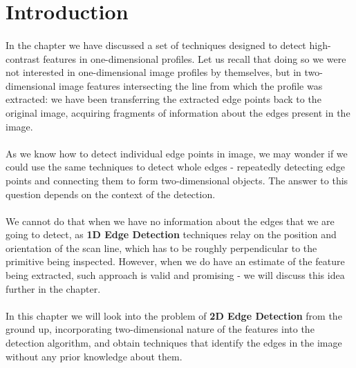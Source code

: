 \section{Introduction}

\paragraph*{}
In the  chapter we have discussed a set of techniques designed to detect high-contrast features in one-dimensional profiles. Let us recall that doing so we were not interested in one-dimensional image profiles by themselves, but in two-dimensional image features intersecting the line from which the profile was extracted: we have been transferring the extracted edge points back to the original image, acquiring fragments of information about the edges present in the image.

\paragraph*{}
As we know how to detect individual edge points in image, we may wonder if we could use the same techniques to detect whole edges - repeatedly detecting edge points and connecting them to form two-dimensional objects. The answer to this question depends on the context of the detection.

\paragraph*{}
We cannot do that when we have no information about the edges that we are going to detect, as \textbf{1D Edge Detection} techniques relay on the position and orientation of the scan line, which has to be roughly perpendicular to the primitive being inspected. However, when we do have an estimate of the feature being extracted, such approach is valid and promising - we will discuss this idea further in the  chapter.

\paragraph*{}
In this chapter we will look into the problem of \textbf{2D Edge Detection} from the ground up, incorporating two-dimensional nature of the features into the detection algorithm, and obtain techniques that identify the edges in the image without any prior knowledge about them.

